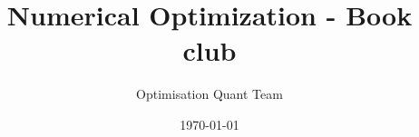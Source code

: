 \documentclass{amsart}
\theoremstyle{definition}
\begin{document}
\title{Numerical Optimization - Book club}
\author{Optimisation Quant Team}
\date{\today}
\maketitle

\tableofcontents


\printbibliography
\end{document}
